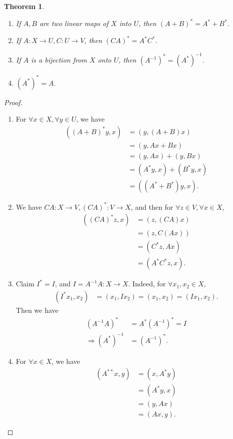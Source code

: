 \documentclass[11pt]{book}
\newtheorem{theorem}{Theorem}[section]
\theoremstyle{definition}
\numberwithin{equation}{chapter}
\begin{document}
\begin{theorem}\label{transpose_linear_map_theorem}
~\begin{enumerate}[label=(\alph*)]
    \item If $A,B$ are two linear maps of $X$ into $U$, then $(A+B)^* = A^* + B^*$.
    \item If $A:X\to U, C:U\to V$, then $(CA)^* = A^* C^*$.
    \item If $A$ is a bijection from $X$ onto $U$, then $\left(A^{-1}\right)^* = \left(A^*\right)^{-1}$.
    \item $\left(A^*\right)^* = A$.
\end{enumerate}
\end{theorem}
\begin{proof}
~\begin{enumerate}[label=(\alph*)]
    \item For $\forall x\in X, \forall y\in U$, we have
    \begin{align*}
        \left((A+B)^*y, x\right) & = (y, (A+B)x) \\
        & = (y, Ax + Bx) \\
        & = (y, Ax) + (y, Bx) \\
        & = (A^*y, x) + (B^*y, x) \\
        & = ((A^* + B^*)y, x).
    \end{align*}
    \item We have $CA:X\to V, (CA)^*:V\to X$, and then for $\forall z\in V, \forall x\in X$,
    \begin{align*}
        \left((CA)^*z, x\right) & = (z, (CA)x) \\
        & = (z, C(Ax)) \\
        & = (C^* z, Ax) \\
        & = (A^* C^* z, x).
    \end{align*}
    \item Claim $I^* = I$, and $I = A^{-1}A: X\to X$. Indeed,  for $\forall x_1, x_2\in X$,
    \begin{align*}
        (I^* x_1, x_2) & = (x_1, Ix_2) = (x_1, x_2) = (Ix_1, x_2).
    \end{align*}
    Then we have 
    \begin{align*}
        \left(A^{-1}A\right)^* & = A^* \left(A^{-1}\right)^* = I \\
        \Rightarrow \left(A^*\right)^{-1} & = \left(A^{-1}\right)^*. 
    \end{align*}
    \item For $\forall x\in X$, we have
    \begin{align*}
        \left(A^{**}x, y\right) & = (x, A^*y) \\
        & = (A^*y, x) \\
        & = (y, Ax) \\
        & = (Ax, y).
    \end{align*}
\end{enumerate}
\end{proof}
\end{document}
